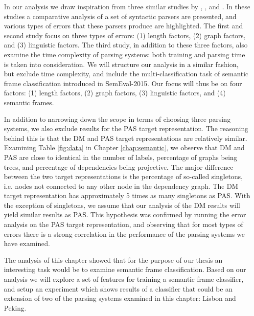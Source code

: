 
In our analysis we draw inspiration from three similar studies by , , and . In these studies a comparative analysis of a set of syntactic parsers are presented, and various types of errors that these parsers produce are highlighted. The first and second study focus on three types of errors: (1) length factors, (2) graph factors, and (3) linguistic factors. The third study, in addition to these three factors, also examine the time complexity of parsing systems: both training and parsing time is taken into consideration. We will structure our analysis in a similar fashion, but exclude time complexity, and include the multi-classification task of semantic frame classification introduced in SemEval-2015. Our focus will thus be on four factors: (1) length factors, (2) graph factors, (3) linguistic factors, and (4) semantic frames.

In addition to narrowing down the scope in terms of choosing three parsing systems, we also exclude results for the PAS target representation. The reasoning behind this is that the DM and PAS target representations are relatively similar. Examining Table \ref{fig:data} in Chapter \ref{chap:semantic}, we observe that DM and PAS are close to identical in the number of labels, percentage of graphs being trees, and percentage of dependencies being projective. The major difference between the two target representations is the percentage of so-called singletons, i.e. nodes not connected to any other node in the dependency graph. The DM target representation has approximately 5 times as many singletons as PAS. With the exception of singletons, we assume that our analysis of the DM results will yield similar results as PAS. This hypothesis was confirmed by running the error analysis on the PAS target representation, and observing that for most types of errors there is a strong correlation in the performance of the parsing systems we have examined.

The analysis of this chapter showed that for the purpose of our thesis an interesting task would be to examine semantic frame classification. Based on our analysis we will explore a set of features for training a semantic frame classifier, and setup an experiment which shows results of a classifier that could be an extension of two of the parsing systems examined in this chapter: Lisbon and Peking.

